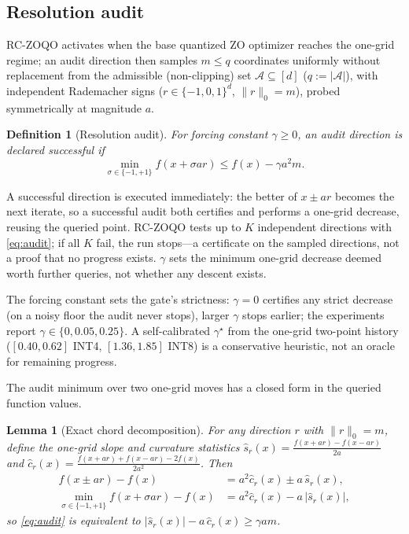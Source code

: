 \documentclass{article}
\newtheorem{definition}{Definition}
\newtheorem{lemma}{Lemma}
\begin{document}
\subsection{Resolution audit}
RC-ZOQO activates when the base quantized ZO optimizer reaches the one-grid regime; an audit direction then samples $m\le q$ coordinates uniformly without replacement from the admissible (non-clipping) set $\mathcal A\subseteq[d]$ ($q:=|\mathcal A|$), with independent Rademacher signs ($r\in\{-1,0,1\}^d$, $\|r\|_0=m$), probed symmetrically at magnitude $a$.

\begin{definition}[Resolution audit]
\label{def:audit}
For forcing constant $\gamma\ge0$, an audit direction is declared successful if
\begin{equation}
\min_{\sigma\in\{-1,+1\}} f(x+\sigma ar)
\le f(x)-\gamma a^2m.
\label{eq:audit}
\end{equation}
\end{definition}
A successful direction is executed immediately: the better of $x\pm ar$ becomes the next iterate, so a successful audit both certifies and performs a one-grid decrease, reusing the queried point. RC-ZOQO tests up to $K$ independent directions with \eqref{eq:audit}; if all $K$ fail, the run stops---a certificate on the sampled directions, not a proof that no progress exists. $\gamma$ sets the minimum one-grid decrease deemed worth further queries, not whether any descent exists.

The forcing constant sets the gate's strictness: $\gamma=0$ certifies any strict decrease (on a noisy floor the audit never stops), larger $\gamma$ stops earlier; the experiments report $\gamma\in\{0,0.05,0.25\}$. A self-calibrated $\gamma^\star$ from the one-grid two-point history ($[0.40,0.62]$ INT4, $[1.36,1.85]$ INT8) is a conservative heuristic, not an oracle for remaining progress.

The audit minimum over two one-grid moves has a closed form in the queried function values.

\begin{lemma}[Exact chord decomposition]
\label{lem:chord}
For any direction $r$ with $\|r\|_0=m$, define the one-grid slope and curvature statistics $\widehat s_r(x)=\frac{f(x+ar)-f(x-ar)}{2a}$ and $\widehat c_r(x)=\frac{f(x+ar)+f(x-ar)-2f(x)}{2a^2}$. Then
\begin{align}
f(x\pm ar)-f(x)&=a^2\widehat c_r(x)\pm a\,\widehat s_r(x),\nonumber\\
\min_{\sigma\in\{-1,+1\}} f(x+\sigma ar)-f(x)&=a^2\widehat c_r(x)-a\,|\widehat s_r(x)|,
\label{eq:chordmin}
\end{align}
so \eqref{eq:audit} is equivalent to $|\widehat s_r(x)|-a\,\widehat c_r(x)\ge\gamma am$.
\end{lemma}
\end{document}
